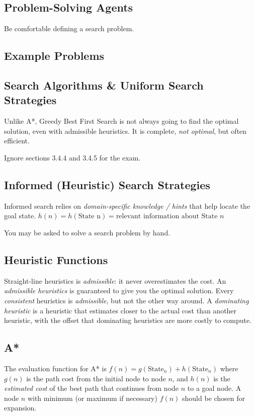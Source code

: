 \documentclass[exam={Midterm},color=true]{cs581exam}
\begin{document}
\subsection{Problem-Solving Agents}\label{subsec:3.1}
Be comfortable defining a search problem.
\subsection{Example Problems}\label{subsec:3.2}
\subsection{Search Algorithms \& Uniform Search Strategies}\label{subsec:3.3-4}
Unlike A*, Greedy Best First Search is not always going to find the optimal solution, even with admissible heuristics.
It is complete, \emph{not optimal}, but often efficient.

Ignore sections 3.4.4 and 3.4.5 for the exam.
\setcounter{subsection}{4}%
\subsection{Informed (Heuristic) Search Strategies}\label{subsec:3.5}
Informed search relies on \emph{domain-specific knowledge / hints} that help locate the goal state.
$h(n)=h(\mbox{State n})=\mbox{relevant information about State } n$

You may be asked to solve a search problem by hand.
\subsection{Heuristic Functions}\label{subsec:3.6}
Straight-line heuristics is \emph{admissible}: it never overestimates the cost.
An \emph{admissible heuristics} is guaranteed to give you the optimal solution.
Every \emph{consistent} heuristics is \emph{admissible}, but not the other way around.
A \emph{dominating heuristic} is a heuristic that estimates closer to the actual cost than another heuristic,
with the offset that dominating heuristics are more costly to compute.

\subsection{A*}\label{subsec:a*}
The evaluation function for A* is $f(n) = g(\mbox{State}_{n}) + h(\mbox{State}_{n})$ where $g(n)$ is the path cost from the initial node to node $n$,
and $h(n)$ is the \emph{estimated cost} of the best path that continues from node $n$ to a goal node.
A node $n$ with minimum (or maximum if necessary) $f(n)$ should be chosen for expansion.
\end{document}
